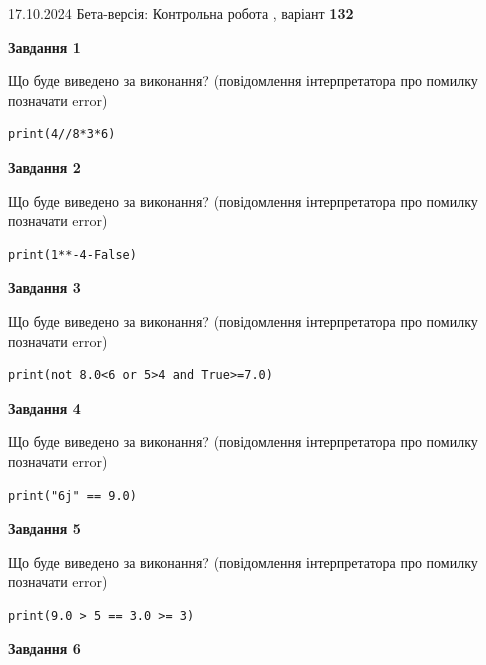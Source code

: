 \documentclass[12pt, ukrainian]{article}
\begin{document}
{\Large{17.10.2024 Бета-версія: Контрольна робота , варіант  \No \textbf { 132 }\par}}
{
\begin {large}
{\begin {center}\textbf{Завдання 1}\end {center}}

Що буде виведено за виконання? (повідомлення інтерпретатора про помилку позначати error)\par
\begin{verbatim}
print(4//8*3*6)
\end{verbatim}

{\begin {center}\textbf{Завдання 2}\end {center}}

Що буде виведено за виконання? (повідомлення інтерпретатора про помилку позначати error)\par
\begin{verbatim}
print(1**-4-False)
\end{verbatim}

{\begin {center}\textbf{Завдання 3}\end {center}}

Що буде виведено за виконання? (повідомлення інтерпретатора про помилку позначати error)\par
\begin{verbatim}
print(not 8.0<6 or 5>4 and True>=7.0)
\end{verbatim}

{\begin {center}\textbf{Завдання 4}\end {center}}

Що буде виведено за виконання? (повідомлення інтерпретатора про помилку позначати error)\par
\begin{verbatim}
print("6j" == 9.0)
\end{verbatim}

{\begin {center}\textbf{Завдання 5}\end {center}}

Що буде виведено за виконання? (повідомлення інтерпретатора про помилку позначати error)\par
\begin{verbatim}
print(9.0 > 5 == 3.0 >= 3)
\end{verbatim}

{\begin {center}\textbf{Завдання 6}\end {center}}


\end{large}}
\end{document}
